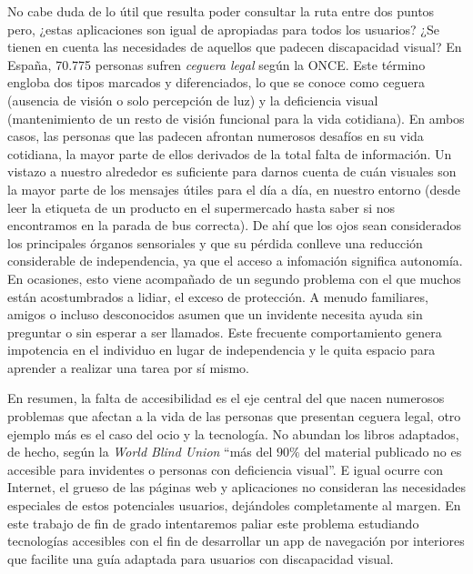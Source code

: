 No cabe duda de lo útil que resulta poder consultar la ruta entre dos puntos pero, ¿estas aplicaciones son igual de apropiadas para todos los usuarios? ¿Se tienen en cuenta las necesidades de aquellos que padecen discapacidad visual? En España, 70.775 personas sufren \textit{ceguera legal} según la ONCE. Este término engloba dos tipos marcados y diferenciados, lo que se conoce como ceguera (ausencia de visión o solo percepción de luz) y la deficiencia visual (mantenimiento de un resto de visión funcional para la vida cotidiana). En ambos casos, las personas que las padecen afrontan numerosos desafíos en su vida cotidiana, la mayor parte de ellos derivados de la total falta de información. Un vistazo a nuestro alrededor es suficiente para darnos cuenta de cuán visuales son la mayor parte de los mensajes útiles para el día a día, en nuestro entorno (desde leer la etiqueta de un producto en el supermercado hasta saber si nos encontramos en la parada de bus correcta). De ahí que los ojos sean considerados los principales órganos sensoriales y que su pérdida conlleve una reducción considerable de independencia, ya que el acceso a infomación significa autonomía. En ocasiones, esto viene acompañado de un segundo problema con el que muchos están acostumbrados a lidiar, el exceso de protección. A menudo familiares, amigos o incluso desconocidos asumen que un invidente necesita ayuda sin preguntar o sin esperar a ser llamados. Este frecuente comportamiento genera impotencia en el individuo en lugar de independencia y le quita espacio para aprender a realizar una tarea por sí mismo. 

En resumen, la falta de accesibilidad es el eje central del que nacen numerosos problemas que afectan a la vida de las personas que presentan ceguera legal, otro ejemplo más es el caso del ocio y la tecnología. No abundan los libros adaptados, de hecho, según la \textit{ World Blind Union} ``más del $90\%$ del material publicado no es accesible para invidentes o personas con deficiencia visual''. E igual ocurre con Internet, el grueso de las páginas web y aplicaciones no consideran las necesidades especiales de estos potenciales usuarios, dejándoles completamente al margen. En este trabajo de fin de grado intentaremos paliar este problema estudiando tecnologías accesibles con el fin de desarrollar un app de navegación por interiores que facilite una guía adaptada para usuarios con discapacidad visual.


